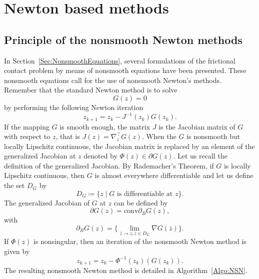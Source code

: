 {\section{Newton based methods}
\label{sec:newtonmethods}


\subsection{Principle of the nonsmooth Newton methods}

In Section~\ref{Sec:NonsmoothEquations}, several formulations of the frictional contact problem by means of nonsmooth equations  have been presented. These nonsmooth equations call for the use of nonsmooth Newton's methods. Remember that the standard Newton method is to solve
\begin{equation}
  \label{eq:NSN1}
  G(z)=0
\end{equation}
by performing the following Newton iteration
\begin{equation}
  \label{eq:NSN2}
  z_{k+1}  =  z_k -  J^{-1}(z_k) G(z_k).
\end{equation}
If the mapping $G$ is smooth enough, the matrix $J$ is the Jacobian matrix of $G$ with respect to $z$, that is $J(z) = \nabla^\top_z G(z)$.
When the $G$ is nonsmooth but locally Lipschitz continuous,  the Jacobian matrix is replaced by an element of the generalized Jacobian at $z$ denoted by $ \Phi(z) \in \partial G(z)$. Let us recall the definition of the generalized Jacobian. By Rademacher's Theorem, if $G$ is locally Lipschitz continuous, then $G$ is almost everywhere differentiable and let us define the set $D_G$ by
\begin{equation}
  \label{eq:NSN4}
  D_G \coloneqq \{z \mid G \text{ is differentiable at } z\}.
\end{equation}
The generalized Jacobian of $G$ at $z$ can be defined by
\begin{equation}
  \label{eq:NSN5}
  \partial G(z) = \mbox{conv} \partial_B G(z),
\end{equation}
with
\begin{equation}
  \label{eq:NSN6}
   \partial_B G(z) = \{\lim_{\bar z \rightarrow z, \bar z\in D_G} \nabla G(\bar z)\}.
 \end{equation}
If $\Phi(z)$ is nonsingular, then an iteration of the nonsmooth Newton method is given by
\begin{equation}
  \label{eq:NSN3}
  z_{k+1}  =  z_k -  \Phi^{-1}(z_k) (G(z_k)).
\end{equation}
The resulting nonsmooth Newton method is detailed in Algorithm~\ref{Algo:NSN}.
}
